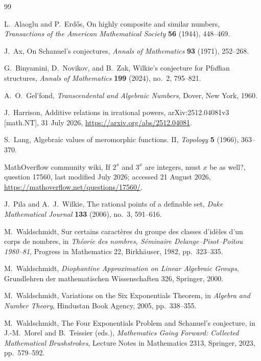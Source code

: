 \documentclass[11pt,oneside]{article}
\theoremstyle{definition}
\begin{document}
\begin{thebibliography}{99}

L.~Alaoglu and P.~Erd\H{o}s,
\newblock On highly composite and similar numbers,
\newblock \emph{Transactions of the American Mathematical Society} \textbf{56} (1944), 448--469.

J.~Ax,
\newblock On Schanuel's conjectures,
\newblock \emph{Annals of Mathematics} \textbf{93} (1971), 252--268.

G.~Binyamini, D.~Novikov, and B.~Zak,
\newblock Wilkie's conjecture for Pfaffian structures,
\newblock \emph{Annals of Mathematics} \textbf{199} (2024), no.~2, 795--821.

A.~O.~Gel'fond,
\newblock \emph{Transcendental and Algebraic Numbers},
\newblock Dover, New York, 1960.

J.~Harrison,
\newblock Additive relations in irrational powers,
\newblock arXiv:2512.04081v3 [math.NT], 31 July 2026,
\newblock \url{https://arxiv.org/abs/2512.04081}.

S.~Lang,
\newblock Algebraic values of meromorphic functions. II,
\newblock \emph{Topology} \textbf{5} (1966), 363--370.

MathOverflow community wiki,
\newblock If $2^x$ and $3^x$ are integers, must $x$ be as well?,
\newblock question 17560, last modified July 2026; accessed 21 August 2026,
\newblock \url{https://mathoverflow.net/questions/17560/}.

J.~Pila and A.~J.~Wilkie,
\newblock The rational points of a definable set,
\newblock \emph{Duke Mathematical Journal} \textbf{133} (2006), no.~3, 591--616.

M.~Waldschmidt,
\newblock Sur certains caract\`eres du groupe des classes d'id\`eles d'un corps de nombres,
\newblock in \emph{Th\'eorie des nombres, S\'eminaire Delange--Pisot--Poitou 1980--81},
Progress in Mathematics 22, Birkh\"auser, 1982, pp.~323--335.

M.~Waldschmidt,
\newblock \emph{Diophantine Approximation on Linear Algebraic Groups},
\newblock Grundlehren der mathematischen Wissenschaften 326, Springer, 2000.

M.~Waldschmidt,
\newblock Variations on the Six Exponentials Theorem,
\newblock in \emph{Algebra and Number Theory}, Hindustan Book Agency, 2005, pp.~338--355.

M.~Waldschmidt,
\newblock The Four Exponentials Problem and Schanuel's conjecture,
\newblock in J.-M.~Morel and B.~Teissier (eds.), \emph{Mathematics Going Forward: Collected Mathematical Brushstrokes},
Lecture Notes in Mathematics 2313, Springer, 2023, pp.~579--592.

\end{thebibliography}
\end{document}
